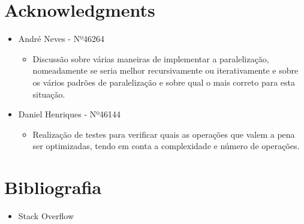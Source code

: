 \documentclass[a4paper]{article}
\begin{document}
\section{Acknowledgments}
\begin{itemize}
\item André Neves - Nº46264
\begin{itemize}
\item Discussão sobre várias maneiras de implementar a paralelização, nomeadamente se seria melhor recursivamente ou iterativamente e sobre os vários padrões de paralelização e sobre qual o mais correto para esta situação.
\end{itemize}
\item Daniel Henriques - Nº46144
\begin{itemize}
\item Realização de testes para verificar quais as operações que valem a pena ser optimizadas, tendo em conta a complexidade e número de operações.
\end{itemize}

\end{itemize}

\section{Bibliografia}
\begin{itemize}
\item Stack Overflow
\end{itemize}
\end{document}

